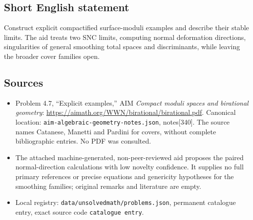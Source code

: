 \documentclass[11pt]{article}
\begin{document}
\subsection{Short English statement}
Construct explicit compactified surface-moduli examples and describe their stable limits. The aid treats two SNC limits, computing normal deformation directions, singularities of general smoothing total spaces and discriminants, while leaving the broader cover families open.
\subsection{Sources}
\begin{itemize}
\item Problem 4.7, ``Explicit examples,'' AIM \emph{Compact moduli spaces and birational geometry}: \url{https://aimath.org/WWN/birational/birational.pdf}. Canonical location: \texttt{aim-algebraic-geometry-notes.json}, notes[340]. The source names Catanese, Manetti and Pardini for covers, without complete bibliographic entries. No PDF was consulted.
\item The attached machine-generated, non-peer-reviewed aid proposes the paired normal-direction calculations with low novelty confidence. It supplies no full primary references or precise equations and genericity hypotheses for the smoothing families; original remarks and literature are empty.
\item Local registry: \texttt{data/unsolvedmath/problems.json}, permanent catalogue entry, exact source code \texttt{catalogue entry}.
\end{itemize}
\end{document}
